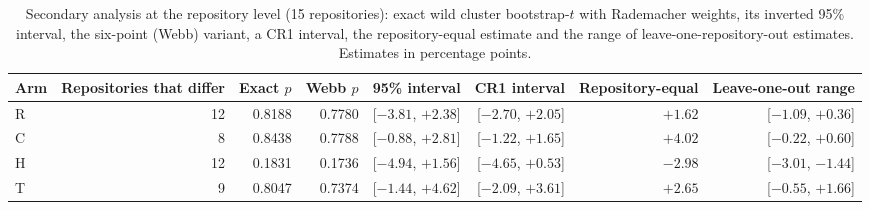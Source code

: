 \begin{table}[!htb]
\centering
\caption{Secondary analysis at the repository level (15 repositories): exact wild cluster bootstrap-$t$ with Rademacher weights, its inverted 95\% interval, the six-point (Webb) variant, a CR1 interval, the repository-equal estimate and the range of leave-one-repository-out estimates. Estimates in percentage points.}\label{tab:s-repolevel}
\footnotesize\setlength{\tabcolsep}{4pt}
\begin{tabular}{lrrrrrrr}
\toprule
Arm & \parbox[b]{1.9cm}{\raggedleft Repositories that differ} & Exact $p$ & Webb $p$ & 95\% interval & CR1 interval & \parbox[b]{1.9cm}{\raggedleft Repository-equal} & Leave-one-out range \\
\midrule
R & 12 & 0.8188 & 0.7780 & [${-}3.81$, ${+}2.38$] & [${-}2.70$, ${+}2.05$] & ${+}1.62$ & [${-}1.09$, ${+}0.36$] \\
C & 8 & 0.8438 & 0.7788 & [${-}0.88$, ${+}2.81$] & [${-}1.22$, ${+}1.65$] & ${+}4.02$ & [${-}0.22$, ${+}0.60$] \\
H & 12 & 0.1831 & 0.1736 & [${-}4.94$, ${+}1.56$] & [${-}4.65$, ${+}0.53$] & ${-}2.98$ & [${-}3.01$, ${-}1.44$] \\
T & 9 & 0.8047 & 0.7374 & [${-}1.44$, ${+}4.62$] & [${-}2.09$, ${+}3.61$] & ${+}2.65$ & [${-}0.55$, ${+}1.66$] \\
\bottomrule
\end{tabular}
\end{table}
